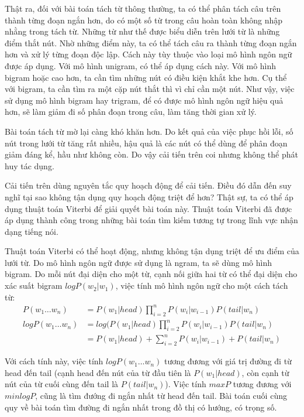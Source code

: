 \documentclass[a4paper,oneside,14pt]{extbook} %
\begin{document}
Thật ra, đối với bài toán tách từ thông thường, ta có thể phân tách
câu trên thành từng đoạn ngắn hơn, do có một số từ trong câu hoàn toàn
không nhập nhằng trong tách từ. Những từ như thế được biểu diễn trên
lưới từ là những điểm thắt nút. Nhờ những điểm này, ta có thể tách
câu ra thành từng đoạn ngắn hơn và xử lý từng đoạn độc lập. Cách này
tùy thuộc vào loại mô hình ngôn ngữ được áp dụng. Với mô hình uni\-gram,
có thể áp dụng cách này. Với mô hình bi\-gram hoặc cao hơn, ta cần tìm
những nút có điều kiện khắt khe hơn. Cụ thể với bi\-gram, ta cần tìm ra
một cặp nút thắt thì vì chỉ cần một nút. Như vậy, việc sử dụng mô hình
bi\-gram hay tri\-gram, để có được mô hình ngôn ngữ hiệu quả hơn,  sẽ làm
giảm đi số phân đoạn trong câu, làm tăng thời gian xử lý.

Bài toán tách từ mờ lại càng khó khăn hơn. Do kết quả của việc phục
hồi lỗi, số nút trong lưới từ tăng rất nhiều, hậu quả là các nút có
thể dùng để phân đoạn giảm đáng kể, hầu như không còn. Do vậy cải tiến
trên coi nhưng không thể phát huy tác dụng.

Cải tiến trên dùng nguyên tắc quy hoạch động để cải tiến. Điều đó dẫn
đến suy nghĩ tại sao không tận dụng quy hoạch động triệt để hơn? Thật
sự, ta có thể áp dụng thuật toán Viterbi để giải quyết bài toán
này. Thuật toán Viterbi đã được áp dụng thành công trong những bài
toán tìm kiếm tương tự trong lĩnh vực nhận dạng tiếng nói.

Thuật toán Viterbi có thể hoạt động, nhưng không tận dụng triệt để ưu
điểm của lưới từ. Do mô hình ngôn ngữ được sử dụng là n\-gram, ta sẽ
dùng mô hình bi\-gram. Do mỗi nút đại diện cho một từ, cạnh nối giữa hai
từ có thể đại diện cho xác suất bi\-gram $logP(w_2|w_1)$, việc tính mô
hình ngôn ngữ cho một cách tách từ:
\begin{align*}
  P(w_1\ldots w_n)&= P(w_1|head)\prod_{i=2}^nP(w_i|w_{i-1})P(tail|w_n)\\
  logP(w_1\ldots w_n)&= log(P(w_1|head)\prod_{i=2}^nP(w_i|w_{i-1})P(tail|w_n)\\
  &=P(w_1|head)+\sum_{i=2}^nP(w_i|w_{i-1})+P(tail|w_n)
\end{align*}

Với cách tính này, việc tính $logP(w_1\ldots w_n)$ tương đương với giá
trị đường đi từ head đến tail (cạnh head đến nút của từ đầu tiên là
$P(w_1|head)$, còn cạnh từ nút của từ cuối cùng đến tail là
$P(tail|w_n)$). Việc tính $maxP$ tương đương với $minlogP$, cũng là
tìm đướng đi ngắn nhất từ head đến tail. Bài toán cuối cùng quy về bài
toán tìm đường đi ngắn nhất trong đồ thị có hướng, có trọng số.
\end{document}

